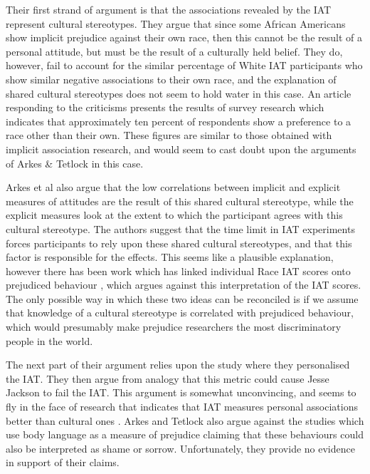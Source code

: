 Their first strand of argument is that the associations revealed by the IAT represent cultural stereotypes. They argue that since some African Americans show implicit prejudice against their own race, then this cannot be the result of a personal attitude, but must be the result of a culturally held belief. They do, however, fail to account for the similar percentage of White IAT participants who show similar negative associations to their own race, and the explanation of shared cultural stereotypes does not seem to hold water in this case. An article responding to the criticisms \cite{Sears2004} presents the results of survey research which indicates that approximately ten percent of respondents show a preference to a race other than their own. These figures are similar to those obtained with implicit association research, and would seem to cast doubt upon the arguments of Arkes \& Tetlock in this case. 

Arkes  et al also argue that the low correlations between implicit and explicit measures of attitudes are the result of this shared cultural stereotype, while the explicit measures look at the extent to which the participant agrees with this cultural stereotype. The authors suggest that the time limit in IAT experiments forces participants to rely upon these shared cultural stereotypes, and that this factor is responsible for the effects. This seems like a plausible explanation, however there has been work which has linked individual Race IAT scores onto prejudiced behaviour \cite{Heider2007}, which argues against this interpretation of the IAT scores. The only possible way in which these two ideas can be reconciled is if we assume that knowledge of a cultural stereotype is correlated with prejudiced behaviour, which would presumably make prejudice researchers the most discriminatory people in the world. 

The next part of their argument relies upon the \cite{Olson2004} study where they personalised the IAT. They then argue from analogy that this metric could cause Jesse Jackson to fail the IAT. This argument is somewhat unconvincing, and seems to fly in the face of research that indicates that IAT measures personal associations better than cultural ones \cite{Nosek2008a}. Arkes and Tetlock also argue against the studies which use body language as a measure of prejudice  claiming that these behaviours could also be interpreted as shame or sorrow. Unfortunately, they provide no evidence in support of their claims. 

